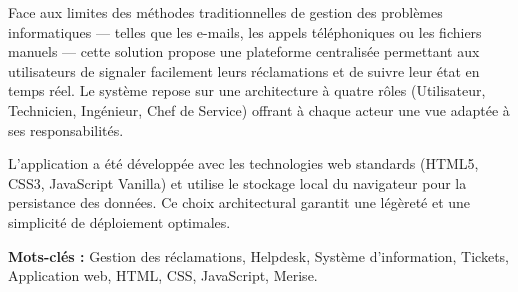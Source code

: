 \documentclass[12pt,a4paper,oneside]{report}
\begin{document}
\vspace{0.5cm}

Face aux limites des méthodes traditionnelles de gestion des problèmes informatiques --- telles que les e-mails, les appels téléphoniques ou les fichiers manuels --- cette solution propose une plateforme centralisée permettant aux utilisateurs de signaler facilement leurs réclamations et de suivre leur état en temps réel. Le système repose sur une architecture à quatre rôles (Utilisateur, Technicien, Ingénieur, Chef de Service) offrant à chaque acteur une vue adaptée à ses responsabilités.

\vspace{0.5cm}

L'application a été développée avec les technologies web standards (HTML5, CSS3, JavaScript Vanilla) et utilise le stockage local du navigateur pour la persistance des données. Ce choix architectural garantit une légèreté et une simplicité de déploiement optimales.

\vspace{0.8cm}

\noindent\textbf{Mots-clés :} Gestion des réclamations, Helpdesk, Système d'information, Tickets, Application web, HTML, CSS, JavaScript, Merise.

\vspace*{\fill}
\end{document}

